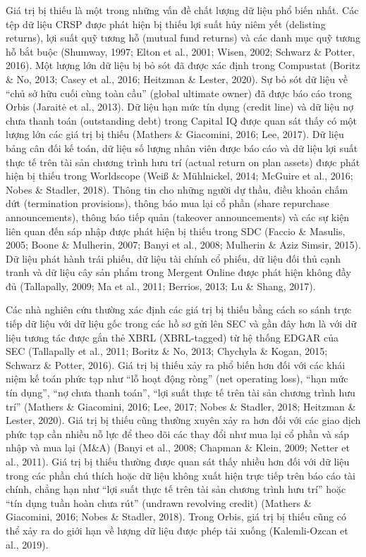 Giá trị bị thiếu là một trong những vấn đề chất lượng dữ liệu phổ biến nhất. Các tệp dữ liệu CRSP được phát hiện bị thiếu lợi suất hủy niêm yết (delisting returns), lợi suất quỹ tương hỗ (mutual fund returns) và các danh mục quỹ tương hỗ bắt buộc (Shumway, 1997; Elton et al., 2001; Wisen, 2002; Schwarz \& Potter, 2016). Một lượng lớn dữ liệu bị bỏ sót đã được xác định trong Compustat (Boritz \& No, 2013; Casey et al., 2016; Heitzman \& Lester, 2020). Sự bỏ sót dữ liệu về ``chủ sở hữu cuối cùng toàn cầu'' (global ultimate owner) đã được báo cáo trong Orbis (Jaraitė et al., 2013). Dữ liệu hạn mức tín dụng (credit line) và dữ liệu nợ chưa thanh toán (outstanding debt) trong Capital IQ được quan sát thấy có một lượng lớn các giá trị bị thiếu (Mathers \& Giacomini, 2016; Lee, 2017). Dữ liệu bảng cân đối kế toán, dữ liệu số lượng nhân viên được báo cáo và dữ liệu lợi suất thực tế trên tài sản chương trình hưu trí (actual return on plan assets) được phát hiện bị thiếu trong Worldscope (Weiß \& Mühlnickel, 2014; McGuire et al., 2016; Nobes \& Stadler, 2018). Thông tin cho những người dự thầu, điều khoản chấm dứt (termination provisions), thông báo mua lại cổ phần (share repurchase announcements), thông báo tiếp quản (takeover announcements) và các sự kiện liên quan đến sáp nhập được phát hiện bị thiếu trong SDC (Faccio \& Masulis, 2005; Boone \& Mulherin, 2007; Banyi et al., 2008; Mulherin \& Aziz Simsir, 2015). Dữ liệu phát hành trái phiếu, dữ liệu tài chính cổ phiếu, dữ liệu đối thủ cạnh tranh và dữ liệu cây sản phẩm trong Mergent Online được phát hiện không đầy đủ (Tallapally, 2009; Ma et al., 2011; Berrios, 2013; Lu \& Shang, 2017).

Các nhà nghiên cứu thường xác định các giá trị bị thiếu bằng cách so sánh trực tiếp dữ liệu với dữ liệu gốc trong các hồ sơ gửi lên SEC và gần đây hơn là với dữ liệu tương tác được gắn thẻ XBRL (XBRL-tagged) từ hệ thống EDGAR của SEC (Tallapally et al., 2011; Boritz \& No, 2013; Chychyla \& Kogan, 2015; Schwarz \& Potter, 2016). Giá trị bị thiếu xảy ra phổ biến hơn đối với các khái niệm kế toán phức tạp như ``lỗ hoạt động ròng'' (net operating loss), ``hạn mức tín dụng'', ``nợ chưa thanh toán'', ``lợi suất thực tế trên tài sản chương trình hưu trí'' (Mathers \& Giacomini, 2016; Lee, 2017; Nobes \& Stadler, 2018; Heitzman \& Lester, 2020). Giá trị bị thiếu cũng thường xuyên xảy ra hơn đối với các giao dịch phức tạp cần nhiều nỗ lực để theo dõi các thay đổi như mua lại cổ phần và sáp nhập và mua lại (M\&A) (Banyi et al., 2008; Chapman \& Klein, 2009; Netter et al., 2011). Giá trị bị thiếu thường được quan sát thấy nhiều hơn đối với dữ liệu trong các phần chú thích hoặc dữ liệu không xuất hiện trực tiếp trên báo cáo tài chính, chẳng hạn như ``lợi suất thực tế trên tài sản chương trình hưu trí'' hoặc ``tín dụng tuần hoàn chưa rút'' (undrawn revolving credit) (Mathers \& Giacomini, 2016; Nobes \& Stadler, 2018). Trong Orbis, giá trị bị thiếu cũng có thể xảy ra do giới hạn về lượng dữ liệu được phép tải xuống (Kalemli-Ozcan et al., 2019).

